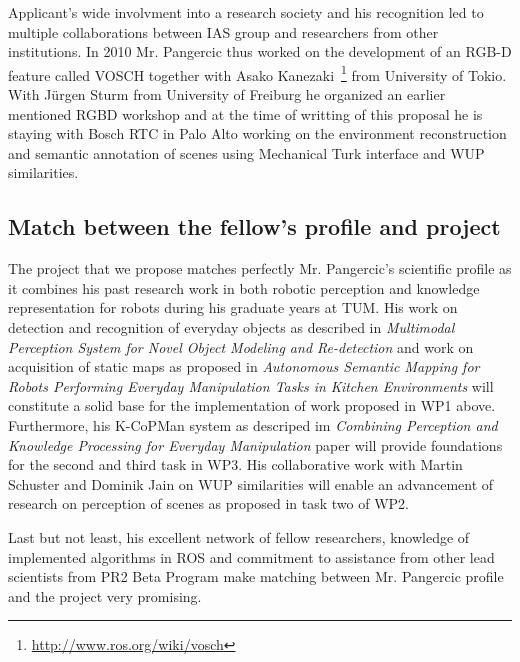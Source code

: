 Applicant's wide involvment into a research society and his recognition led to multiple collaborations
between IAS group and researchers from other institutions. In 2010 Mr. Pangercic
thus worked on the development of an RGB-D feature called VOSCH together with
Asako Kanezaki~\footnote{\url{http://www.ros.org/wiki/vosch}} from University of Tokio.
With J\"urgen Sturm from University of Freiburg he organized an earlier mentioned
RGBD workshop and at the time of writting of this proposal he is staying with Bosch RTC
in Palo Alto working on the environment reconstruction and semantic annotation
of scenes using Mechanical Turk interface and WUP similarities.
\subsection{Match between the fellow's profile and project}
The project that we propose matches perfectly Mr. Pangercic's scientific profile as it combines
his past research work in both robotic perception and knowledge representation for robots
during his graduate years at TUM. His work on detection and recognition of everyday objects as
described in \emph{Multimodal Perception System for Novel Object Modeling and Re-detection}
and work on acquisition of static maps as proposed in \emph{Autonomous Semantic Mapping for Robots Performing  
Everyday Manipulation Tasks in Kitchen Environments} will constitute a solid base for the
implementation of work proposed in WP1 above. Furthermore, his K-CoPMan system as descriped im
\emph{Combining Perception and Knowledge Processing for Everyday Manipulation} paper will
provide foundations for the second and third task in WP3. His collaborative work with Martin Schuster
and Dominik Jain on WUP similarities will enable an advancement of research on perception
of scenes as proposed in task two of WP2.

Last but not least, his excellent network of fellow researchers, knowledge of implemented algorithms
in ROS and commitment to assistance from other lead scientists from PR2 Beta Program make
matching between Mr. Pangercic profile and the project very promising.

